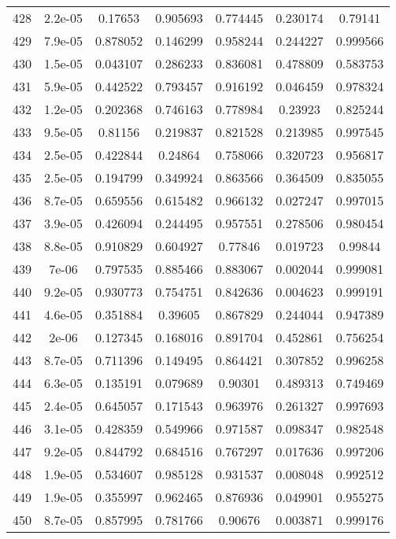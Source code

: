 \begin{table}
\begin{tabular}{c|c|c|c|c|c|c}
428 & 2.2e-05 & 0.17653 & 0.905693 & 0.774445 & 0.230174 & 0.79141\\
429 & 7.9e-05 & 0.878052 & 0.146299 & 0.958244 & 0.244227 & 0.999566\\
430 & 1.5e-05 & 0.043107 & 0.286233 & 0.836081 & 0.478809 & 0.583753\\
431 & 5.9e-05 & 0.442522 & 0.793457 & 0.916192 & 0.046459 & 0.978324\\
432 & 1.2e-05 & 0.202368 & 0.746163 & 0.778984 & 0.23923 & 0.825244\\
433 & 9.5e-05 & 0.81156 & 0.219837 & 0.821528 & 0.213985 & 0.997545\\
434 & 2.5e-05 & 0.422844 & 0.24864 & 0.758066 & 0.320723 & 0.956817\\
435 & 2.5e-05 & 0.194799 & 0.349924 & 0.863566 & 0.364509 & 0.835055\\
436 & 8.7e-05 & 0.659556 & 0.615482 & 0.966132 & 0.027247 & 0.997015\\
437 & 3.9e-05 & 0.426094 & 0.244495 & 0.957551 & 0.278506 & 0.980454\\
438 & 8.8e-05 & 0.910829 & 0.604927 & 0.77846 & 0.019723 & 0.99844\\
439 & 7e-06 & 0.797535 & 0.885466 & 0.883067 & 0.002044 & 0.999081\\
440 & 9.2e-05 & 0.930773 & 0.754751 & 0.842636 & 0.004623 & 0.999191\\
441 & 4.6e-05 & 0.351884 & 0.39605 & 0.867829 & 0.244044 & 0.947389\\
442 & 2e-06 & 0.127345 & 0.168016 & 0.891704 & 0.452861 & 0.756254\\
443 & 8.7e-05 & 0.711396 & 0.149495 & 0.864421 & 0.307852 & 0.996258\\
444 & 6.3e-05 & 0.135191 & 0.079689 & 0.90301 & 0.489313 & 0.749469\\
445 & 2.4e-05 & 0.645057 & 0.171543 & 0.963976 & 0.261327 & 0.997693\\
446 & 3.1e-05 & 0.428359 & 0.549966 & 0.971587 & 0.098347 & 0.982548\\
447 & 9.2e-05 & 0.844792 & 0.684516 & 0.767297 & 0.017636 & 0.997206\\
448 & 1.9e-05 & 0.534607 & 0.985128 & 0.931537 & 0.008048 & 0.992512\\
449 & 1.9e-05 & 0.355997 & 0.962465 & 0.876936 & 0.049901 & 0.955275\\
450 & 8.7e-05 & 0.857995 & 0.781766 & 0.90676 & 0.003871 & 0.999176\\
\end{tabular}
\end{table}
